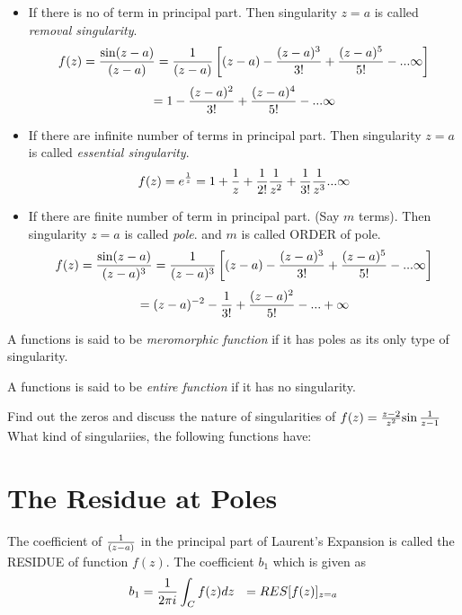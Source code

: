 \begin{itemize}
	\item  If there is no of term in principal part. Then singularity $z=a$ is called \textit{removal singularity}.
	\[f(z) = {\sin (z-a) \over (z-a)} = {1 \over (z-a)}\left[(z-a) -{(z-a)^3 \over 3!}+{(z-a)^5 \over 5!} - ... \infty \right] \]
	\[= 1 -{(z-a)^2 \over 3!}+{(z-a)^4 \over 5!} - ... \infty\]
	\item  If there are infinite number of terms in principal part. Then singularity $z=a$ is called \textit{essential singularity}.
		\[f(z) = e^{1 \over z} =  1 +{1 \over z}+{1 \over 2!}{1 \over z^2} +{1 \over 3!}{1 \over z^3} ... \infty\]
	\item If there are finite number of term in principal part. (Say $m$ terms). Then singularity $z=a$ is called \textit{pole}. and $m$ is called ORDER of pole.  
	\[f(z) = {\sin (z-a) \over (z-a)^3} = {1 \over (z-a)^3}\left[(z-a) -{(z-a)^3 \over 3!}+{(z-a)^5 \over 5!} - ... \infty \right] \]
	\[= (z-a)^{-2} -{1 \over 3!} + {(z-a)^2 \over 5!} - ... + \infty \]
\end{itemize}
\begin{df}
A functions is said to be \textit{meromorphic function} if it has poles as its only type of singularity.
\end{df}
\begin{df}
A functions is said to be \textit{entire function} if it has no singularity.
\end{df}

\begin{problems}
	\prob  Find out the zeros and discuss the nature of singularities of $f(z)={z-2 \over z^2}{\sin{1 \over z-1}}$
	\prob  What kind  of singulariies, the following functions have:

										
	\end{problems}
	
	\section{The Residue at Poles}
	The coefficient of $1 \over (z-a)$ in the principal part of Laurent's Expansion is called the RESIDUE of function $f(z)$. The coefficient $b_1$ which is given as 
	\[b_1 = {1 \over 2\pi i} \int_C f(z) dz  ~~ = RES[f(z)]_{z=a}\]
